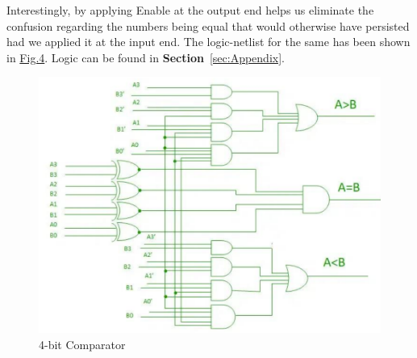 \documentclass[a4paper, titlepage]{article}
\begin{document}
Interestingly, by applying Enable at the output end helps us eliminate the confusion regarding the numbers being equal that 
would otherwise have persisted had we applied it at the input end. The logic-netlist for the same has been shown in 
\hyperlink{4C}{Fig.4}. Logic can be found in \textbf{Section}~\ref{sec:Appendix}.
\begin{figure}[htp]
    \centering
    \hypertarget{4C}{\includegraphics[scale = 0.6]{Image_4-bit_Comparator.png}}
    \caption{4-bit Comparator}
    \label{fig:fig3}
\end{figure}
\end{document}
